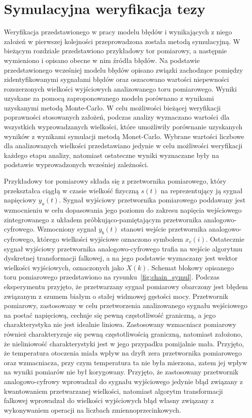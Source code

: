\chapter{Symulacyjna weryfikacja tezy}

Weryfikacja przedstawionego w pracy modelu błędów i wynikających z niego założeń w pierwszej kolejności przeprowadzona została metodą symulacyjną. W bieżącym rozdziale przedstawiono przykładowy tor pomiarowy, a następnie wymieniono i opisano obecne w nim źródła błędów. Na podstawie przedstawionego wcześniej modelu błędów opisano związki zachodzące pomiędzy zidentyfikowanymi sygnałami błędów oraz oszacowano wartości niepewności rozszerzonych wielkości wyjściowych analizowanego toru pomiarowego. Wyniki uzyskane za pomocą zaproponowanego modelu porównano z wynikami uzyskanymi metodą Monte-Carlo. W celu możliwości bieżącej weryfikacji poprawności stosowanych założeń, podczas analizy wyznaczano wartości dla wszystkich wyprowadzanych wielkości, które umożliwiły porównanie uzyskanych wyników z wynikami symulacji metodą Monet-Carlo. Wybrane wartości liczbowe dla analizowanych wielkości przedstawiano jedynie w celu możliwości weryfikacji każdego etapu analizy, natomiast ostateczne wyniki wyznaczane były na podstawie wyprowadzonych wcześniej zależności.

Przykładowy tor pomiarowy składa się z przetwornika pomiarowego, który przekształca ciągłą w czasie wielkość fizyczną $s(t)$ na reprezentujący ją sygnał napięciowy $y_{a}(t)$. Sygnał wyjściowy przetwornika pomiarowego poddawany jest wzmocnieniu w celu dopasowania jego poziomu do zakresu napięcia wejściowego zintegrowanego z układem próbkująco-pamiętającym przetwornika analogowo-cyfrowego. Wzmocniony sygnał $y_{b}(t)$ stanowi wejście przetwornika analogowo-cyfrowego, którego wielkości wyjściowe oznaczono symbolem $x_{c}(i)$. Ostatecznie sygnał wyjściowy przetwornika analogowo-cyfrowego trafia na wejście algorytmu dyskretnej transformacji falkowej, a na jego podstawie wyznaczany jest wektor wielkości wyjściowych, oznaczonych jako $X(k)$. Schemat blokowy opisanego toru pomiarowego przedstawiono na rysunku~\ref{fig:chain_symul}. Podczas eksperymentu przyjęto, że przetwarzany sygnał pomiarowy obarczony jest błędem związanym z szumem białym o stałej widmowej gęstości mocy. Przetwornik pomiarowy, zastosowany w celu przetworzenia analizowanego sygnału wejściowego na postać napięciową, cechuje się pewną częstotliwość graniczną, a jego charakterystyka nie jest idealnie liniowa. Zastosowany wzmacniacz pomiarowy również charakteryzuje się pewną częstotliwością graniczną, natomiast założono, że nieliniowość charakterystyki jest w jego przypadku pomijalnie mała. Przyjęto, że temperatura otoczenia miała wpływ na dryft zera przetwornika pomiarowego oraz wzmacniacza, przy czym temperatura ta nie była mierzona, zatem jej wpływ na wyniki pomiarów nie był korygowany. Przyjęto, że zastosowany przetwornik analogowo-cyfrowy wprowadzał do sygnału wyjściowego jedynie błąd związany z kwantowaniem przetwarzanej wielkości, natomiast algorytm transformacji falkowej wprowadzał do wielkości wyjściowych błąd własny związany z wykonywaniem operacji na liczbach zmiennoprzecinkowych.


